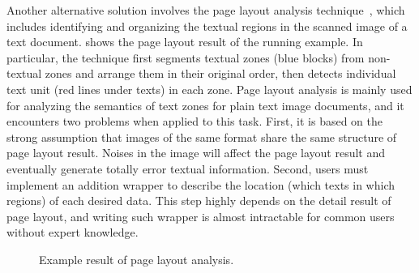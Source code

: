 Another alternative solution involves the page layout analysis technique~\cite{o1993document},
which includes identifying and organizing the textual regions
in the scanned image of a text document.
 shows the page layout result of the running example.
In particular, the technique first segments textual zones (blue blocks) from
non-textual zones and arrange them in their original order,
then detects individual text unit (red lines under texts) in each zone.
Page layout analysis is mainly used for analyzing the semantics of text zones
for plain text image documents,
and it encounters two problems when applied to this task.
First, it is based on the strong assumption that images of the same format
share the same structure of page layout result.
Noises in the image will affect the page layout result and
eventually generate totally error textual information.
Second, users must implement an addition wrapper to describe the location
(which texts in which regions) of each desired data.
This step highly depends on the detail result of page layout,
and writing such wrapper is almost intractable
for common users without expert knowledge.
\begin{figure}[ht]
\centering
{}
\caption{Example result of page layout analysis.}
\label{fig:running-page-layout}
\end{figure}

